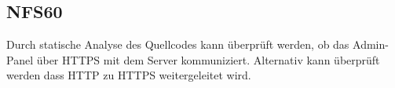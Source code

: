 \subsection*{NFS60}
Durch statische Analyse des Quellcodes kann überprüft werden, ob das Admin-Panel über HTTPS mit dem Server kommuniziert.
Alternativ kann überprüft werden dass HTTP zu HTTPS weitergeleitet wird.